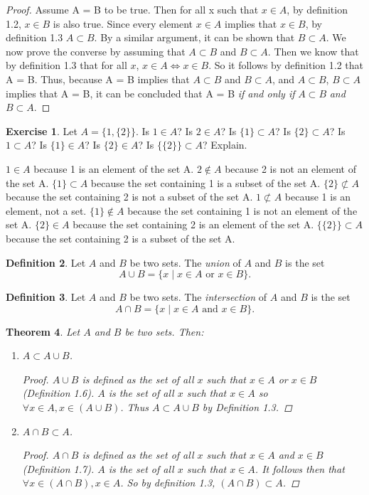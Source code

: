 \documentclass[12pt]{article}
\newtheorem{theorem}{Theorem}[section]
\theoremstyle{definition}
\newtheorem{definition}[theorem]{Definition}
\newtheorem{exercise}[theorem]{Exercise}
\numberwithin{equation}{subsection}
\begin{document}
\begin{proof}
Assume A = B to be true. Then for all x such that $x \in A$, by definition 1.2, $x \in B$ is also true. Since every element $x \in A$ implies that $x \in B$, by definition 1.3 $A \subset B$. By a similar argument, it can be shown that $B \subset A$. We now prove the converse by assuming that $A \subset B$ and $B \subset A$. Then we know that by definition 1.3 that for all $x$, $x \in A \iff x \in B$. So it follows by definition 1.2 that A = B. Thus, because A = B implies that $A \subset B$ and $B \subset A$, and $A \subset B$, $B \subset A$ implies that A = B, it can be concluded that A = B {\it if and only if} $A \subset B$ {\it and} $B \subset A$.
\end{proof}

\begin{exercise}
Let $A=\{1, \{2\}\}$.  Is $1\in A$?  Is $2\in A$?  Is $\{1\}\subset A$?  Is $\{2\}\subset A$?  
Is $1\subset A$?  Is $\{1\}\in A$?  Is $\{2\}\in A$?  Is $\{\{2\}\}\subset A$?  
Explain.
\end{exercise}
$1 \in A$ because 1 is an element of the set A.
$2 \not\in A$ because 2 is not an element of the set A.
$\{1\} \subset A$ because the set containing 1 is a subset of the set A.
$\{2\} \not\subset A$ because the set containing 2 is not a subset of the set A.
$1 \not\subset A$ because 1 is an element, not a set. 
$\{1\} \not\in A$ because the set containing 1 is not an element of the set A.
$\{2\} \in A$ because the set containing 2 is an element of the set A.
$\{\{2\}\}\subset A$ because the set containing 2 is a subset of the set A.
\begin{definition}  Let $A$ and $B$ be two sets. 
The \emph{union} of $A$ and $B$ is the set
\[
A \cup B = \{x \mid \text{$x \in A$ or $x \in B$} \}.
\]
\end{definition}

\begin{definition}  Let $A$ and $B$ be two sets. 
The \emph{intersection} of $A$ and $B$ is the set
\[
A \cap B = \{ x \mid \text{$x \in A$ and $x \in B$} \}.
\]
\end{definition}

\begin{theorem}  
Let $A$ and $B$ be two sets.  Then:
\begin{enumerate}
\item
$A\subset A\cup B$.
\begin{proof}
$A \cup B$ is defined as the set of all $x$ such that $x \in A$ or $x \in B$ (Definition 1.6). $A$ is the set of all $x$ such that $x \in A$ so $\forall x \in A, x \in (A \cup B)$. Thus $A \subset A \cup B$ by Definition 1.3.
\end{proof}
\item
$A\cap B\subset A$.
\begin{proof}
$A \cap B$ is defined as the set of all $x$ such that $x \in A$ and $x \in B$ (Definition 1.7). $A$ is the set of all $x$ such that $x \in A$. It follows then that $\forall x \in (A \cap B), x \in A$. So by definition 1.3, $(A \cap B) \subset A$.
\end{proof}
\end{enumerate}
\end{theorem}
\end{document}
